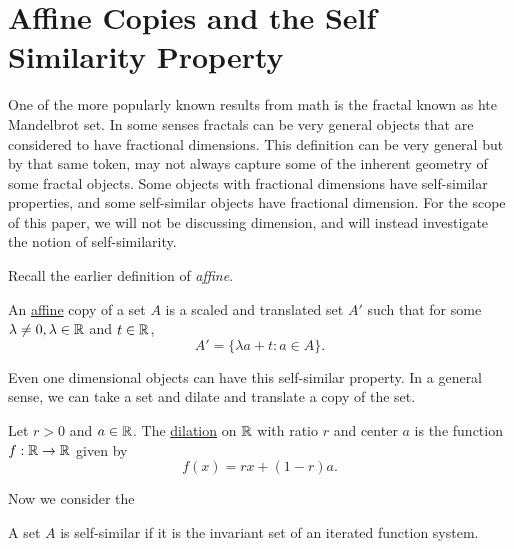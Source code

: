 \section{Affine Copies and the Self Similarity Property}


One of the more popularly known results from math is the fractal known as hte Mandelbrot set.  In some senses fractals can be very general objects that are considered to have fractional dimensions.  This definition can be very general but by that same token, may not always capture some of the inherent geometry of some fractal objects. Some objects with fractional dimensions have self-similar properties, and some self-similar objects have fractional dimension.  For the scope of this paper, we will not be discussing dimension, and will instead investigate the notion of self-similarity. 

Recall the earlier definition of \textit{affine}.  
\begin{definition}
    An \underline{affine} copy of a set $A$ is a scaled and translated set $A'$ such that for some $\lambda\neq 0, \lambda \in \mathbb{R}$ and $t \in \mathbb{R}$,  $$A' = \{\lambda a + t : a \in A\}.$$
\end{definition}

Even one dimensional objects can have this self-similar property.  In a general sense, we can take a set and dilate and translate a copy of the set.  

\begin{definition}[Dilation]
    Let $r>0$ and $a \in \mathbb{R}$.  The \underline{dilation} on $\mathbb{R}$ with ratio $r$ and center $a$ is the function $f: \mathbb{R} \to \mathbb{R}$ given by $$f(x)= rx + (1-r) a.$$
\end{definition}

Now we consider the 

\begin{definition}
    A set $A$ is self-similar if it is the invariant set of an iterated function system. 
\end{definition}

